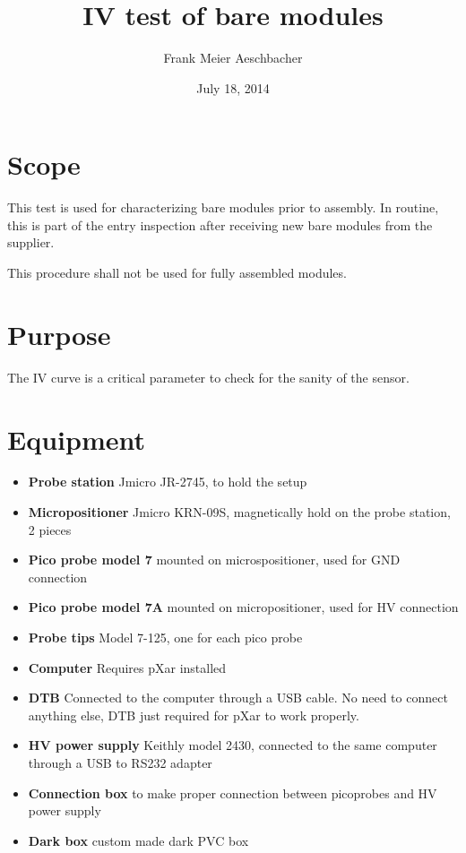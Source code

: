 \documentclass[10pt]{unlsilabsop}
\title{IV test of bare modules}
\date{July 18, 2014}
\author{Frank Meier Aeschbacher}
\begin{document}
\maketitle

\section{Scope}
This test is used for characterizing bare modules prior to assembly. In routine, this is part of the entry inspection after receiving new bare modules from the supplier.

This procedure shall not be used for fully assembled modules.

\section{Purpose}
The IV curve is a critical parameter to check for the sanity of the sensor.



\section{Equipment}

\begin{itemize}
\item \textbf{Probe station} Jmicro JR-2745, to hold the setup
\item \textbf{Micropositioner} Jmicro KRN-09S, magnetically hold on the probe station, 2 pieces
\item \textbf{Pico probe model 7} mounted on microspositioner, used for GND connection
\item \textbf{Pico probe model 7A} mounted on micropositioner, used for HV connection
\item \textbf{Probe tips} Model 7-125, one for each pico probe
\item \textbf{Computer} Requires pXar installed
\item \textbf{DTB} Connected to the computer through a USB cable. No need to connect anything else, DTB just required for pXar to work properly.
\item \textbf{HV power supply} Keithly model 2430, connected to the same computer through a USB to RS232 adapter
\item \textbf{Connection box} to make proper connection between picoprobes and HV power supply
\item \textbf{Dark box} custom made dark PVC box
\end{itemize}
\end{document}
